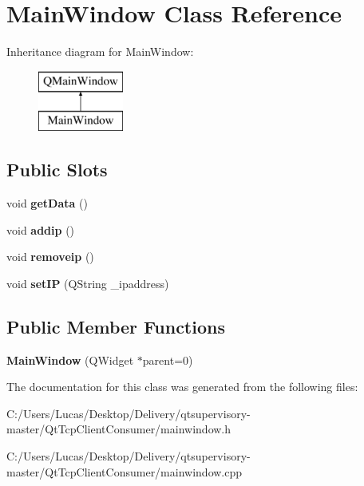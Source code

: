 \hypertarget{class_main_window}{}\section{Main\+Window Class Reference}
\label{class_main_window}
Inheritance diagram for Main\+Window\+:\begin{figure}[H]
\begin{center}
\leavevmode
\includegraphics[height=2.000000cm]{class_main_window}
\end{center}
\end{figure}
\subsection*{Public Slots}
\begin{DoxyCompactItemize}
\item 
\mbox{\label{class_main_window_a4a2ddf4cf2ec8e240cc340416b1df792}} 
void {\bfseries get\+Data} ()
\item 
\mbox{\label{class_main_window_a66885589d165c59dc8cb39d2b005959a}} 
void {\bfseries addip} ()
\item 
\mbox{\label{class_main_window_a5a8e49852ff8201bc7d7974504f7b7df}} 
void {\bfseries removeip} ()
\item 
\mbox{\label{class_main_window_ac83bca3631082745d67f2e3297ecde3e}} 
void {\bfseries set\+IP} (Q\+String \+\_\+ipaddress)
\end{DoxyCompactItemize}
\subsection*{Public Member Functions}
\begin{DoxyCompactItemize}
\item 
\mbox{\label{class_main_window_a8b244be8b7b7db1b08de2a2acb9409db}} 
{\bfseries Main\+Window} (Q\+Widget $\ast$parent=0)
\end{DoxyCompactItemize}


The documentation for this class was generated from the following files\+:\begin{DoxyCompactItemize}
\item 
C\+:/\+Users/\+Lucas/\+Desktop/\+Delivery/qtsupervisory-\/master/\+Qt\+Tcp\+Client\+Consumer/mainwindow.\+h\item 
C\+:/\+Users/\+Lucas/\+Desktop/\+Delivery/qtsupervisory-\/master/\+Qt\+Tcp\+Client\+Consumer/mainwindow.\+cpp\end{DoxyCompactItemize}
